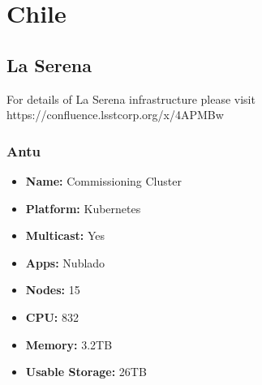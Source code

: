 \section{Chile}
\subsection{La Serena}
For details of La Serena infrastructure please visit https://confluence.lsstcorp.org/x/4APMBw

\newpage
\subsubsection{Antu}
\begin{itemize}
  \itemsep0em 
  \item \textbf{Name:}      Commissioning Cluster
  \item \textbf{Platform:}  Kubernetes
  \item \textbf{Multicast:} Yes
  \item \textbf{Apps:}      Nublado
  \item \textbf{Nodes:}     15
  \item \textbf{CPU:}       832
  \item \textbf{Memory:}    3.2TB
  \item \textbf{Usable Storage:}   26TB
\end{itemize}
